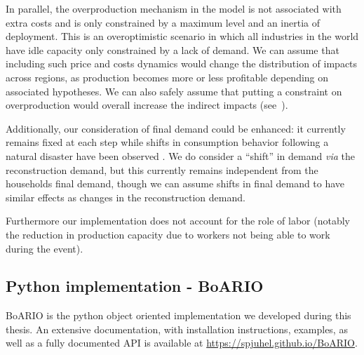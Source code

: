 In parallel, the overproduction mechanism in the model is not associated with
extra costs and is only constrained by a maximum level and an inertia of
deployment. This is an overoptimistic scenario in which all industries in the
world have idle capacity only constrained by a lack of demand. We can assume
that including such price and costs dynamics would change the distribution of
impacts across regions, as production becomes more or less profitable depending
on associated hypotheses. We can also safely assume that putting a constraint on
overproduction would overall increase the indirect impacts
(see~).

Additionally, our consideration of final demand could be enhanced: it currently
remains fixed at each step while shifts in consumption behavior following a
natural disaster have been observed \parencite{kennett-hensel-2012-limin-consum,
alatrista-salas-2021-impac-natur}. We do consider a ``shift'' in demand
\emph{via} the reconstruction demand, but this currently remains independent
from the households final demand, though we can assume shifts in final demand to
have similar effects as changes in the reconstruction demand.

Furthermore our implementation does not account for the role of labor (notably
the reduction in production capacity due to workers not being able to work
during the event).

\subsection{Python implementation - BoARIO}
\label{sec:implementation}

BoARIO is the python object oriented implementation we developed during this
thesis. An extensive documentation, with installation instructions, examples, as
well as a fully documented \acrfull{API} is available at
\url{https://spjuhel.github.io/BoARIO}.

